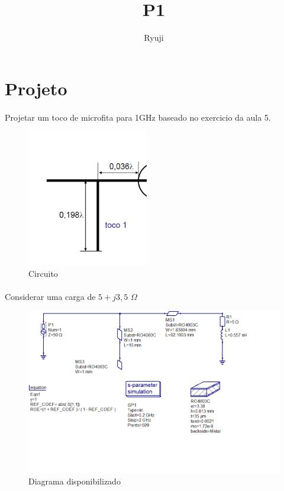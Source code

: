 \documentclass{article}
\title{P1}
\date{}
\author{Ryuji}
\begin{document}
\section{Projeto}
\paragraph{} Projetar um toco de microfita para 1GHz baseado no exercicio da aula 5.

\begin{figure}[h!]
	\begin{center}
	\includegraphics[width=200px]{images/img_proj.png}
	\end{center}
	\caption{Circuito}
	\label{fig:imagem1}
\end{figure}

\paragraph{}Considerar uma carga de $5 + j3,5$ $\Omega$

\begin{figure}[h!]
	\begin{center}
	\includegraphics[width=\linewidth]{images/diagrama_ini.png}
	\end{center}
	\caption{Diagrama disponibilizado}
	\label{fig:imagem1}
\end{figure}
\end{document}
